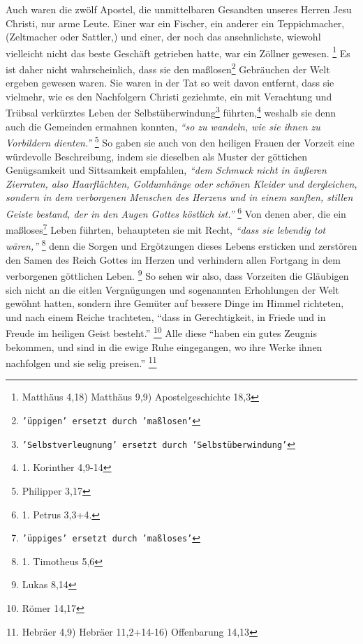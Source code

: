 Auch waren die zwölf Apostel, die unmittelbaren Gesandten unseres Herren Jesu
Christi, nur arme Leute. Einer war ein Fischer, ein anderer ein 
Teppichmacher,
(Zeltmacher oder Sattler,) und einer, der noch das ansehnlichste, wiewohl
vielleicht nicht das beste Geschäft getrieben hatte, war ein Zöllner
gewesen.
\footnote{Matthäus 4,18) Matthäus 9,9) Apostelgeschichte 18,3}
Es ist daher nicht wahrscheinlich, dass sie den maßlosen\footnote{\texttt{'üppigen' ersetzt 
durch 'maßlosen'}} Gebräuchen der Welt ergeben
gewesen waren. Sie waren in der Tat so weit davon entfernt, dass sie vielmehr,
wie es den Nachfolgern Christi geziehmte, ein mit Verachtung und Trübsal
verkürztes Leben der Selbstüberwindung\footnote{\texttt{'Selbstverleugnung' ersetzt durch 
'Selbstüberwindung'}} führten,\footnote{1. Korinther 4,9-14}
weshalb sie denn auch die Gemeinden ermahnen konnten,
\textit{"`so zu wandeln, wie sie ihnen zu Vorbildern dienten."'}
\footnote{Philipper 3,17}
So gaben sie auch von den heiligen
Frauen der Vorzeit 
eine würdevolle Beschreibung, indem sie dieselben als Muster
der göttichen Genügsamkeit und Sittsamkeit empfahlen,
\textit{"`dem Schmuck nicht in
äußeren Zierraten, also Haarflächten, Goldumhänge oder schönen Kleider und dergleichen,
sondern in dem verborgenen Menschen des Herzens und in einem sanften, stillen
Geiste bestand, der in den Augen Gottes köstlich ist."'}
\footnote{1. Petrus 3,3+4.}
Von denen aber, die ein maßloses\footnote{\texttt{'üppiges' ersetzt durch 'maßloses'}} Leben 
führten, behaupteten sie mit Recht,
\textit{"`dass sie lebendig tot wären,"'}
\footnote{1. Timotheus 5,6}
denn die Sorgen und
Ergötzungen dieses Lebens ersticken und zerstören den Samen des Reich
Gottes im
Herzen und verhindern allen Fortgang in dem verborgenen göttlichen
Leben.
\footnote{Lukas 8,14}
So sehen wir also, dass Vorzeiten die Gläubigen sich
nicht an die eitlen Vergnügungen und sogenannten Erhohlungen der Welt gewöhnt
hatten, sondern ihre Gemüter auf bessere Dinge im Himmel richteten, und nach
einem Reiche trachteten,
"`dass in Gerechtigkeit, in Friede und in Freude im
heiligen Geist besteht."'
\footnote{Römer 14,17}
Alle diese
"`haben ein gutes
Zeugnis bekommen, und sind in die ewige Ruhe eingegangen, wo ihre Werke ihnen
nachfolgen und sie selig preisen."'
\footnote{Hebräer 4,9) Hebräer 11,2+14-16)
Offenbarung 14,13}


